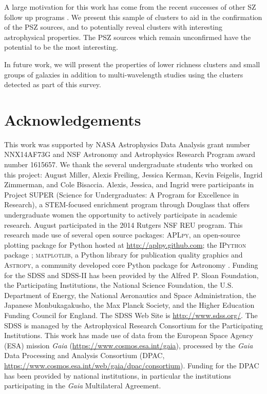 \documentclass[apj, revtex4-1]{emulateapj}
\begin{document}
A large motivation for this work has come from the recent successes of other SZ follow up programs . We present this sample of clusters to aid in the confirmation of the PSZ sources, and to potentially reveal clusters with interesting astrophysical properties. The PSZ sources which remain unconfirmed have the potential to be the most interesting.

In future work, we will present the properties of lower richness clusters and small groups of galaxies in addition to multi-wavelength studies using the clusters detected as part of this survey.

\section*{Acknowledgements}
This work was supported by NASA Astrophysics Data Analysis grant number NNX14AF73G and NSF Astronomy and Astrophysics Research Program award number 1615657. We thank the several undergraduate students who worked on this project: August Miller, Alexis Freiling, Jessica Kerman, Kevin Feigelis, Ingrid Zimmerman, and Cole Bisaccia. Alexis, Jessica, and Ingrid were participants in Project SUPER (Science for Undergraduates: A Program for Excellence in Research), a STEM-focused enrichment program through Douglass that offers undergraduate women the opportunity to actively participate in academic research. August participated in the 2014 Rutgers NSF REU program.
This research made use of several open source packages: \textsc{APLpy}, an open-source plotting package for Python hosted at \url{http://aplpy.github.com}; the \textsc{IPython} package \citep{Perez2007}; \textsc{matplotlib}, a Python library for publication quality graphics \citep{Hunter2007} and \textsc{Astropy}, a community developed core Python package for Astronomy \citep{TheAstropyCollaboration2013}.
Funding for the SDSS and SDSS-II has been provided by the Alfred P. Sloan Foundation, the Participating Institutions, the National Science Foundation, the U.S. Department of Energy, the National Aeronautics and Space Administration, the Japanese Monbukagakusho, the Max Planck Society, and the Higher Education Funding Council for England. The SDSS Web Site is \url{http://www.sdss.org/}. The SDSS is managed by the Astrophysical Research Consortium for the Participating Institutions.
This work has made use of data from the European Space Agency (ESA) mission \textit{Gaia} (\url{https://www.cosmos.esa.int/gaia}), processed by the \textit{Gaia} Data Processing and Analysis Consortium (DPAC, \url{https://www.cosmos.esa.int/web/gaia/dpac/consortium}). Funding for the DPAC has been provided by national institutions, in particular the institutions participating in the \textit{Gaia} Multilateral Agreement.
\end{document}
